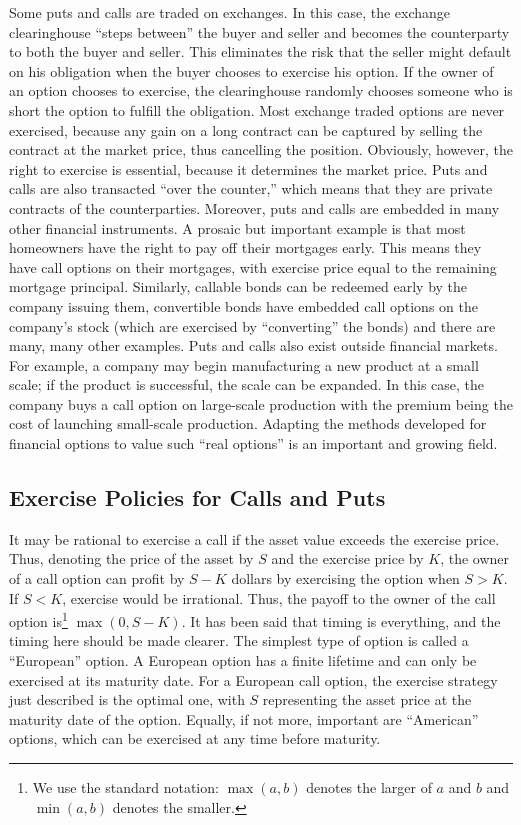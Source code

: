 Some puts and calls are traded on exchanges.  In this case, the exchange clearinghouse ``steps between'' the buyer and seller and becomes the counterparty to both the buyer and seller.  This eliminates the risk that the seller might default on his obligation when the buyer chooses to exercise his option.  If the owner of an option chooses to exercise, the clearinghouse randomly chooses someone who is short the option to fulfill the obligation.  Most exchange traded options are never exercised, because any gain on a long contract can be captured by selling the contract at the market price, thus cancelling the position.  Obviously, however, the right to exercise is essential, because it determines the market price.  Puts and calls are also transacted ``over the counter,''  which means that they are private contracts of the counterparties.  Moreover, puts and calls are embedded in many other financial instruments.  A prosaic but important example is that most homeowners have the right to pay off their mortgages early.  This means they have call options on their mortgages, with exercise price equal to the remaining mortgage principal.  Similarly, callable bonds can be redeemed early by the company issuing them, convertible bonds have  embedded call options on the company's stock (which are exercised by ``converting'' the bonds) and there are many, many other examples.  Puts and calls also exist outside financial markets.  For example, a company may begin manufacturing a new product at a small scale; if the product is successful, the scale can be expanded.  In this case, the company buys a call option on large-scale production with the premium being the cost of launching small-scale production.  Adapting the methods developed for financial options to value such ``real options'' is an important and growing field. 

\subsection*{Exercise Policies for Calls and Puts}

It may be rational to exercise a call if the asset value exceeds the exercise price.  Thus, denoting the price of the asset by $S$ and the exercise price by $K$, the owner of a call option can profit by $S-K$ dollars by exercising the option when $S>K$.  If $S<K$, exercise would be irrational.  Thus, the payoff to the owner of the call option is\footnote{We use the standard notation:  $\max(a,b)$ denotes the larger of $a$ and $b$ and $\min(a,b)$ denotes the smaller.} $\max(0,S-K)$.  It has been said that timing is everything, and the timing here should be made clearer.  The simplest type of option is called a ``European'' option.   A European option has a finite lifetime and can only be exercised at its maturity date.  For a European call option, the exercise strategy just described is the optimal one, with $S$ representing the asset price at the maturity date of the option.  Equally, if not more, important are ``American'' options,  which can be exercised at any time before maturity.   

